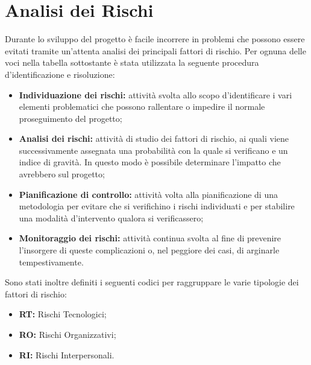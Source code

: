 \section{Analisi dei Rischi}
Durante lo sviluppo del progetto è facile incorrere in problemi che possono essere evitati tramite un'attenta analisi dei principali fattori di rischio.
Per ognuna delle voci nella tabella sottostante è stata utilizzata la seguente procedura d'identificazione e risoluzione:

\begin{itemize}
	\item \textbf{Individuazione dei rischi: }attività svolta allo scopo d'identificare i vari elementi problematici che possono rallentare o impedire il normale proseguimento del progetto;
	\item \textbf{Analisi dei rischi: }attività di studio dei fattori di rischio, ai quali viene successivamente assegnata una probabilità con la quale si verificano e un indice di gravità. In questo modo è possibile determinare l'impatto che avrebbero sul progetto;
	\item \textbf{Pianificazione di controllo: } attività volta alla pianificazione di una metodologia per evitare che si verifichino i rischi individuati e per stabilire una modalità d'intervento qualora si verificassero;
	\item \textbf{Monitoraggio dei rischi: }attività continua svolta al fine di prevenire l'insorgere di queste complicazioni o, nel peggiore dei casi, di arginarle tempestivamente.
\end{itemize}

Sono stati inoltre definiti i seguenti codici per raggruppare le varie tipologie dei fattori di rischio:
\begin{itemize}
	\item \textbf{RT: }Rischi Tecnologici;
	\item \textbf{RO: }Rischi Organizzativi;
	\item \textbf{RI: }Rischi Interpersonali.
\end{itemize}

